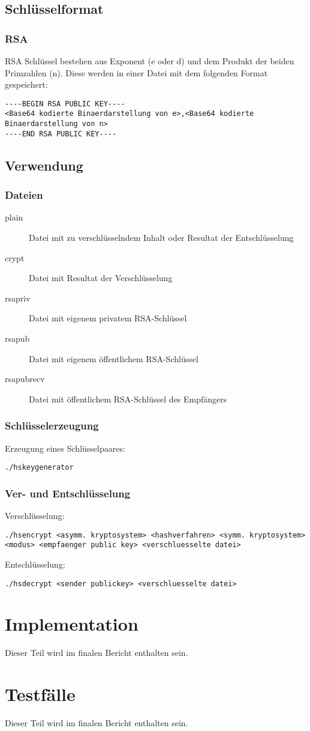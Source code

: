 \documentclass[11pt,a4paper,parskip=half]{scrartcl}
\begin{document}
\subsection{Schlüsselformat}
\subsubsection{RSA}
RSA Schlüssel bestehen aus Exponent (e oder d) und dem Produkt der beiden Primzahlen (n). Diese werden in einer Datei mit dem folgenden Format gespeichert:
\begin{lstlisting}
----BEGIN RSA PUBLIC KEY----
<Base64 kodierte Binaerdarstellung von e>,<Base64 kodierte Binaerdarstellung von n>
----END RSA PUBLIC KEY----
\end{lstlisting}

\subsection{Verwendung}
\subsubsection{Dateien}
\begin{description}
	\item[plain] Datei mit zu verschlüsselndem Inhalt oder Resultat der Entschlüsselung
	\item[crypt] Datei mit Resultat der Verschlüsselung
	\item[rsapriv] Datei mit eigenem privatem RSA-Schlüssel
	\item[rsapub] Datei mit eigenem öffentlichem RSA-Schlüssel
	\item[rsapubrecv] Datei mit öffentlichem RSA-Schlüssel des Empfängers
\end{description}

\subsubsection{Schlüsselerzeugung}
Erzeugung eines Schlüsselpaares:
\begin{lstlisting}
./hskeygenerator
\end{lstlisting}

\subsubsection{Ver- und Entschlüsselung}
Verschlüsselung:
\begin{lstlisting}
./hsencrypt <asymm. kryptosystem> <hashverfahren> <symm. kryptosystem> <modus> <empfaenger public key> <verschluesselte datei>
\end{lstlisting}

Entschlüsselung:
\begin{lstlisting}
./hsdecrypt <sender publickey> <verschluesselte datei>
\end{lstlisting}

\section{Implementation}
Dieser Teil wird im finalen Bericht enthalten sein.

\section{Testfälle}
Dieser Teil wird im finalen Bericht enthalten sein.
\end{document}

